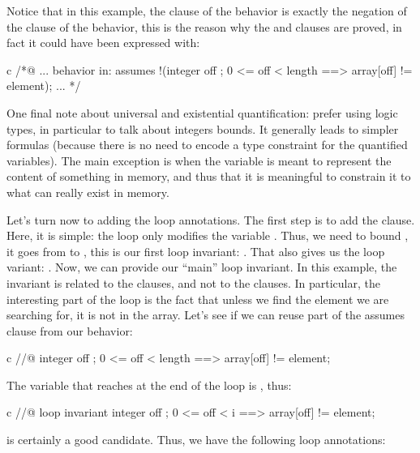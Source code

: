 Notice that in this example, the  clause of the
 behavior is exactly the negation of the 
clause of the  behavior, this is the reason why the
 and  clauses are proved, in fact it
could have been expressed with:


\begin{CodeBlock}{c}
  /*@ ...
    behavior in:
      assumes !(\forall integer off ; 0 <= off < length ==> array[off] != element);
    ...
  */
\end{CodeBlock}


One final note about universal and existential quantification: prefer using logic
types, in particular to talk about integers bounds. It generally leads to simpler
formulas (because there is no need to encode a type constraint for the quantified
variables). The main exception is when the variable is meant to represent the
content of something in memory, and thus that it is meaningful to constrain it
to what can really exist in memory.


Let's turn now to adding the loop annotations. The first step is to add the
 clause. Here, it is simple: the loop only modifies the
variable . Thus, we need to bound , it goes from
 to , this is our first loop invariant:
. That also gives us the loop variant:
. Now, we can provide our ``main'' loop invariant.
In this example, the invariant is related to the  clauses, and not to the
 clauses. In particular, the interesting part of the loop is
the fact that unless we find the element we are searching for, it is not in the array.
Let's see if we can reuse part of the assumes clause from our  behavior:
\begin{CodeBlock}{c}
  //@ \forall integer off ; 0 <= off < length ==> array[off] != element;
\end{CodeBlock}
The variable that reaches  at the end of the loop is
, thus:
\begin{CodeBlock}{c}
  //@ loop invariant \forall integer off ; 0 <= off < i ==> array[off] != element;
\end{CodeBlock}
is certainly a good candidate. Thus, we have the following loop annotations:




